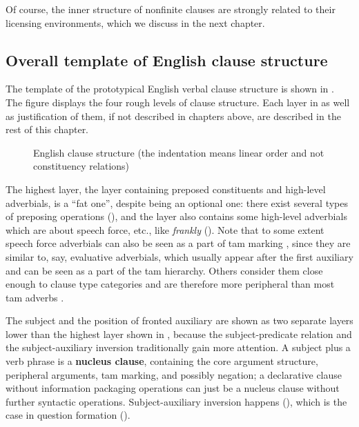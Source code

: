 \documentclass[UTF8, a4paper, oneside, scheme=plain, 12pt]{ctexbook}
\newcommand*{\citesec}[1]{\S~{#1}}
\newcommand*{\citepages}[1]{pp.~{#1}}
\newcommand*{\concept}[1]{\textbf{#1}}
\newcommand{\form}[1]{\emph{#1}}
\begin{document}
Of course, the inner structure of nonfinite clauses are strongly related to their licensing environments,
which we discuss in the next chapter.

\subsection{Overall template of English clause structure}\label{sec:clause-template}

The template of the prototypical English verbal clause structure 
is shown in .
The figure displays the four rough levels of clause structure.
Each layer in  as well as justification of them,
if not described in chapters above, are described 
in the rest of this chapter.

\begin{figure}[H]
    \centering
    {\small }
    \caption{English clause structure (the indentation means linear order and not constituency relations)}
    \label{fig:clause-template}
\end{figure}

The highest layer, the layer containing preposed constituents and high-level adverbials, 
is a ``fat one'', despite being an optional one: there exist several types of preposing operations (),
and the layer also contains some high-level adverbials
which are about speech force, etc., %
like \form{frankly} ().
Note that to some extent speech force adverbials 
can also be seen as a part of \acs{tam} marking
\citep[\citesec{4.4}]{cinque1999adverbs},
since they are similar to, say, evaluative adverbials, 
which usually appear after the first auxiliary 
and can be seen as a part of the \acs{tam} hierarchy.
Others consider them close enough to clause type categories 
and are therefore more peripheral than most \acs{tam} adverbs 
\citep[\citepages{214-216}]{van2013clause}.

The subject and the position of fronted auxiliary
are shown as two separate layers lower than the highest layer shown in ,
because the subject-predicate relation 
and the subject-auxiliary inversion 
traditionally gain more attention.
A subject plus a verb phrase is a \concept{nucleus clause}, containing the core argument structure, peripheral arguments, \acs{tam} marking, and possibly negation;
a declarative clause without information packaging operations
can just be a nucleus clause without further syntactic operations.
Subject-auxiliary inversion happens (),
which is the case in %
question formation ().
\end{document}
